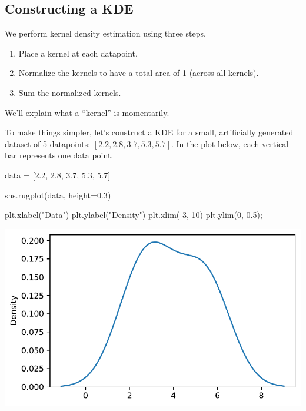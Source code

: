 \documentclass[
  letterpaper,
  DIV=11,
  numbers=noendperiod]{scrreprt}
\newenvironment{Shaded}{\begin{snugshade}}{\end{snugshade}}
\newcommand{\DecValTok}[1]{\textcolor[rgb]{0.68,0.00,0.00}{#1}}
\newcommand{\FloatTok}[1]{\textcolor[rgb]{0.68,0.00,0.00}{#1}}
\newcommand{\NormalTok}[1]{\textcolor[rgb]{0.00,0.23,0.31}{#1}}
\newcommand{\OperatorTok}[1]{\textcolor[rgb]{0.37,0.37,0.37}{#1}}
\newcommand{\StringTok}[1]{\textcolor[rgb]{0.13,0.47,0.30}{#1}}
\providecommand{\tightlist}{%
  \setlength{\itemsep}{0pt}\setlength{\parskip}{0pt}}\usepackage{longtable,booktabs,array}
\begin{document}
\subsection{Constructing a KDE}\label{constructing-a-kde}

We perform kernel density estimation using three steps.

\begin{enumerate}
\def\labelenumi{\arabic{enumi}.}
\tightlist
\item
  Place a kernel at each datapoint.
\item
  Normalize the kernels to have a total area of 1 (across all kernels).
\item
  Sum the normalized kernels.
\end{enumerate}

We'll explain what a ``kernel'' is momentarily.

To make things simpler, let's construct a KDE for a small, artificially
generated dataset of 5 datapoints: \([2.2, 2.8, 3.7, 5.3, 5.7]\). In the
plot below, each vertical bar represents one data point.

\begin{Shaded}
\begin{Highlighting}[]
\NormalTok{data }\OperatorTok{=}\NormalTok{ [}\FloatTok{2.2}\NormalTok{, }\FloatTok{2.8}\NormalTok{, }\FloatTok{3.7}\NormalTok{, }\FloatTok{5.3}\NormalTok{, }\FloatTok{5.7}\NormalTok{]}

\NormalTok{sns.rugplot(data, height}\OperatorTok{=}\FloatTok{0.3}\NormalTok{)}

\NormalTok{plt.xlabel(}\StringTok{"Data"}\NormalTok{)}
\NormalTok{plt.ylabel(}\StringTok{"Density"}\NormalTok{)}
\NormalTok{plt.xlim(}\OperatorTok{{-}}\DecValTok{3}\NormalTok{, }\DecValTok{10}\NormalTok{)}
\NormalTok{plt.ylim(}\DecValTok{0}\NormalTok{, }\FloatTok{0.5}\NormalTok{)}\OperatorTok{;}
\end{Highlighting}
\end{Shaded}

\includegraphics{visualization_2/visualization_2_files/figure-pdf/cell-4-output-1.pdf}
\end{document}
